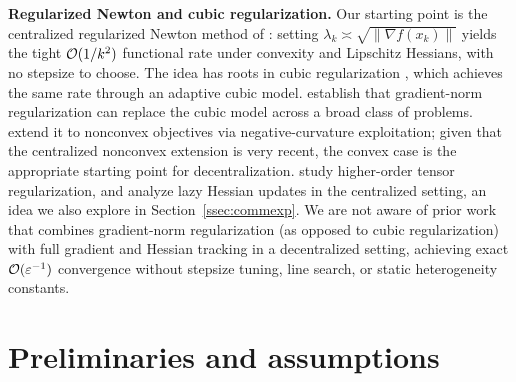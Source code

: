 \documentclass[review,onefignum,onetabnum]{siamart171218}
\begin{document}
	\noindent\textbf{Regularized Newton and cubic regularization.}
	Our starting point is the centralized regularized Newton method of
	\citet{mishchenko2023rn}: setting
	$\lambda_k\asymp\sqrt{\|\nabla f(x_k)\|}$ yields the tight
	$\mathcal{O}(1/k^2)$ functional rate under convexity and Lipschitz Hessians,
	with no stepsize to choose.
	The idea has roots in cubic regularization
	\citep{nesterov2006cubic,cartis2011arc}, which achieves the same rate
	through an adaptive cubic model.
	\citet{doikov2024gradient} establish that gradient-norm
	regularization can replace the cubic model across a broad class of
	problems.
	\citet{ding2025nonconvex} extend it to nonconvex objectives via
	negative-curvature exploitation; given that the centralized
	nonconvex extension is very recent, the convex case is the
	appropriate starting point for decentralization.
	\citet{doikov2021optimization} study higher-order tensor
	regularization, and \citet{hanzely2022newton} analyze lazy Hessian
	updates in the centralized setting, an idea we also explore in
	Section~\ref{ssec:commexp}.
	We are not aware of prior work that combines gradient-norm
	regularization (as opposed to cubic regularization) with full
	gradient and Hessian tracking in a decentralized setting,
	achieving exact $\mathcal{O}(\varepsilon^{-1})$ convergence without
	stepsize tuning, line search, or static heterogeneity constants.
	
	\section{Preliminaries and assumptions}\label{sec:prelim}
\end{document}

